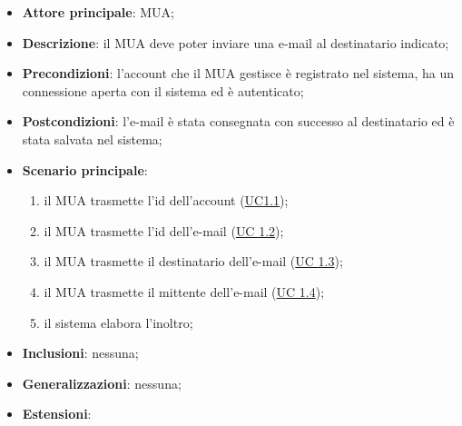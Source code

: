     \begin{itemize}
        \item \textbf{Attore principale}: MUA;
        \item \textbf{Descrizione}: il MUA deve poter inviare una e-mail al destinatario indicato;
        \item \textbf{Precondizioni}: l’account che il MUA gestisce è registrato nel sistema, ha un connessione aperta con il sistema ed è autenticato;
        \item \textbf{Postcondizioni}: l'e-mail è stata consegnata con successo al destinatario ed è stata salvata nel sistema;
        \item \textbf{Scenario principale}:
            \begin{enumerate}
                \item il MUA trasmette l'id dell'account (\hyperref[sec:UC1.1]{UC1.1});
                \item il MUA trasmette l'id dell'e-mail (\hyperref[sec:UC1.2]{UC 1.2});
                \item il MUA trasmette il destinatario dell'e-mail (\hyperref[sec:UC1.3]{UC 1.3});
                \item il MUA trasmette il mittente dell'e-mail (\hyperref[sec:UC1.4]{UC 1.4});
                \item il sistema elabora l'inoltro;
            \end{enumerate}
        \item \textbf{Inclusioni}: nessuna;
        \item \textbf{Generalizzazioni}: nessuna;
        \item \textbf{Estensioni}: 
        


\end{itemize}
